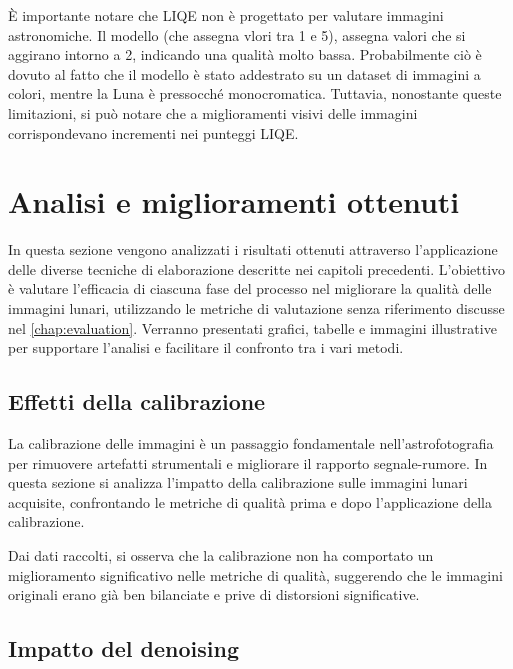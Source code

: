 È importante notare che LIQE non è progettato per valutare immagini astronomiche. Il modello (che assegna vlori tra 1 e 5), assegna valori che si aggirano intorno a 2, indicando una qualità molto bassa. Probabilmente ciò è dovuto al fatto che il modello è stato addestrato su un dataset di immagini a colori, mentre la Luna è pressocché monocromatica. Tuttavia, nonostante queste limitazioni, si può notare che a miglioramenti visivi delle immagini corrispondevano incrementi nei punteggi LIQE.

\section{Analisi e miglioramenti ottenuti} \label{sec:analysis}

In questa sezione vengono analizzati i risultati ottenuti attraverso l'applicazione delle diverse tecniche di elaborazione descritte nei capitoli precedenti. L'obiettivo è valutare l'efficacia di ciascuna fase del processo nel migliorare la qualità delle immagini lunari, utilizzando le metriche di valutazione senza riferimento discusse nel \cref{chap:evaluation}. Verranno presentati grafici, tabelle e immagini illustrative per supportare l'analisi e facilitare il confronto tra i vari metodi.

\subsection{Effetti della calibrazione} \label{subsec:analysis_cal}

La calibrazione delle immagini è un passaggio fondamentale nell'astrofotografia per rimuovere artefatti strumentali e migliorare il rapporto segnale-rumore. In questa sezione si analizza l'impatto della calibrazione sulle immagini lunari acquisite, confrontando le metriche di qualità prima e dopo l'applicazione della calibrazione.


Dai dati raccolti, si osserva che la calibrazione non ha comportato un miglioramento significativo nelle metriche di qualità, suggerendo che le immagini originali erano già ben bilanciate e prive di distorsioni significative. 

\subsection{Impatto del denoising} \label{subsec:analysis_den}

